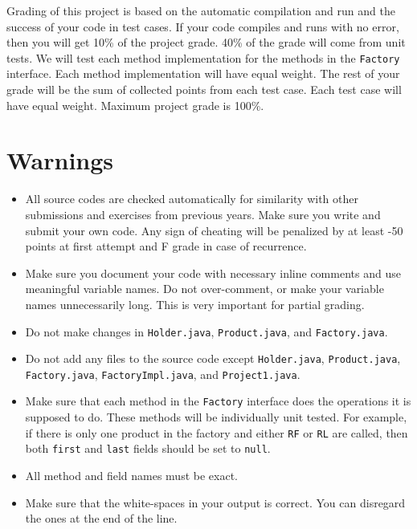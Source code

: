 \documentclass[12pt]{article}
\begin{document}
Grading of this project is based on the automatic compilation and run and the success of your code in test cases. If your code compiles and runs with no error, then you will get 10\% of the project grade. 40\% of the grade will come from unit tests. We will test each method implementation for the methods in the \texttt{Factory} interface. Each method implementation will have equal weight. The rest of your grade will be the sum of collected points from each test case. Each test case will have equal weight. Maximum project grade is 100\%.

\section{Warnings}

\begin{itemize}

\item All source codes are checked automatically for similarity with other submissions and exercises from previous years. Make sure you write and submit your own code. Any sign of cheating will be penalized by at least -50 points at first attempt and F grade in case of recurrence.

\item Make sure you document your code with necessary inline comments and use meaningful variable names. Do not over-comment, or make your variable names unnecessarily long. This is very important for partial grading.

\item Do not make changes in \texttt{Holder.java}, \texttt{Product.java}, and \texttt{Factory.java}.

\item Do not add any files to the source code except \texttt{Holder.java}, \texttt{Product.java}, \texttt{Factory.java}, \texttt{FactoryImpl.java}, and \texttt{Project1.java}. 

\item Make sure that each method in the \texttt{Factory} interface does the operations it is supposed to do. These methods will be individually unit tested. For example, if there is only one product in the factory and either \verb|RF| or \verb|RL| are called, then both \texttt{first} and \texttt{last} fields should be set to \texttt{null}.

\item All method and field names must be exact. 

\item Make sure that the white-spaces in your output is correct. You can disregard the ones at the end of the line.


\end{itemize}
\end{document}
